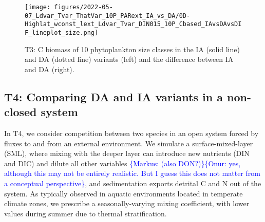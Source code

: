 \documentclass[gmd, manuscript]{copernicus}
\newcommand{\onur}[1]{\textcolor{blue}{\{Onur: #1\}}}
\newcommand{\markus}[1]{\textcolor{blue}{\{Markus: #1\}}}
\begin{document}
\begin{figure}[ht!]
\texttt{[image: figures/2022-05-07\_Ldvar\_Tvar\_ThatVar\_10P\_PARext\_IA\_vs\_DA/0D-Highlat\_wconst\_lext\_Ldvar\_Tvar\_DIN015\_10P\_Cbased\_IAvsDAvsDIF\_lineplot\_size.png]}
\caption{T3: C biomass of 10 phytoplankton size classes in the IA (solid line) and DA (dotted line) variants (left) and the difference between IA and DA (right).
}\label{f.T3res}
\end{figure}


\FloatBarrier%
\subsection{T4: Comparing DA and IA variants in a non-closed system}\label{s.resT4}

In T4, we consider competition between two species in an open system forced by fluxes to and from an external environment.  We simulate a surface-mixed-layer (SML), where mixing with the deeper layer can introduce new nutrients (DIN and DIC) and dilute all other variables \markus{(also DON?)}\onur{yes, although this may not be entirely realistic. But I guess this does not matter from a conceptual perspective}, and sedimentation exports detrital C and N out of the system. As typically observed in aquatic environments located in temperate climate zones, we prescribe a seasonally-varying mixing coefficient, with lower values during summer due to thermal stratification.
\end{document}
